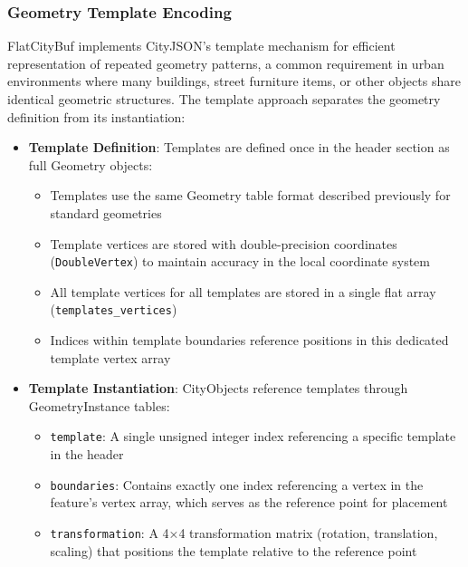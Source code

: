 \subsubsection{Geometry Template Encoding}
\label{methodology:feature_encoding:geometry_encoding:templates}

FlatCityBuf implements CityJSON's template mechanism for efficient representation of repeated geometry patterns, a common requirement in urban environments where many buildings, street furniture items, or other objects share identical geometric structures. The template approach separates the geometry definition from its instantiation:

\begin{itemize}
  \item \textbf{Template Definition}: Templates are defined once in the header section as full Geometry objects:
    \begin{itemize}
      \item Templates use the same Geometry table format described previously for standard geometries
      \item Template vertices are stored with double-precision coordinates (\texttt{DoubleVertex}) to maintain accuracy in the local coordinate system
      \item All template vertices for all templates are stored in a single flat array (\texttt{templates\_vertices})
      \item Indices within template boundaries reference positions in this dedicated template vertex array
    \end{itemize}

  \item \textbf{Template Instantiation}: CityObjects reference templates through GeometryInstance tables:
    \begin{itemize}
      \item \texttt{template}: A single unsigned integer index referencing a specific template in the header
      \item \texttt{boundaries}: Contains exactly one index referencing a vertex in the feature's vertex array, which serves as the reference point for placement
      \item \texttt{transformation}: A 4×4 transformation matrix (rotation, translation, scaling) that positions the template relative to the reference point
    \end{itemize}
\end{itemize}

